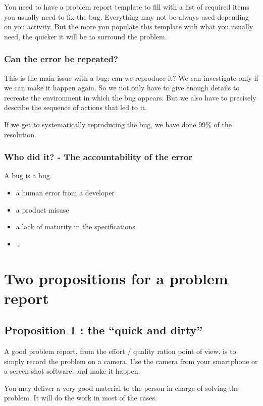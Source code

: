 You need to have a problem report template to fill with a list of required items you usually need to fix the bug. Everything may not be always used depending on you activity. But the more you populate this template with what you usually need, the quicker it will be to surround the problem.

\subsubsection{Can the error be repeated?}

This is the main issue with a bug: can we reproduce it? We can investigate only if we can make it happen again. So we not only have to give enough details to recreate the environment in which the bug appears. But we also have to precisely describe the sequence of actions that led to it.

If we get to systematically reproducing the bug, we have done 99\% of the resolution.

\subsubsection{Who did it? - The accountability of the error}

A bug is a bug.
\begin{itemize}
    \item a human error from a developer
    \item a product misuse
    \item a lack of maturity in the specifications
    \item \dots
\end{itemize}

\section{Two propositions for a problem report}

\subsection{Proposition 1 : the “quick and dirty”}
A good problem report, from the effort / quality ration point of view, is to simply record the problem on a camera. Use the camera from your smartphone or a screen shot software, and make it happen.

You may deliver a very good material to the person in charge of solving the problem. It will do the work in most of the cases.

